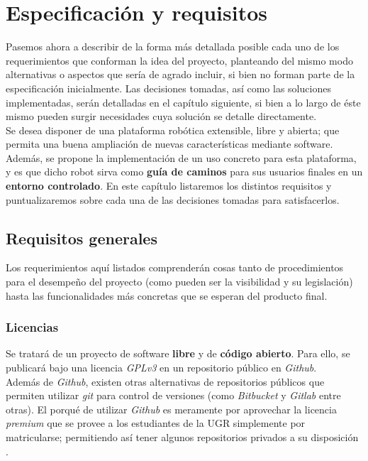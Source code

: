 \chapter{Especificación y requisitos}

Pasemos ahora a describir de la forma más detallada posible cada uno de los requerimientos que conforman la idea del proyecto, planteando del mismo modo alternativas o aspectos que sería de agrado incluir, si bien no forman parte de la especificación inicialmente. Las decisiones tomadas, así como las soluciones implementadas, serán detalladas en el capítulo siguiente, si bien a lo largo de éste mismo pueden surgir necesidades cuya solución se detalle directamente.\\

Se desea disponer de una plataforma robótica extensible, libre y abierta; que permita una buena ampliación de nuevas características mediante software. Además, se propone la implementación de un uso concreto para esta plataforma, y es que dicho robot sirva como \textbf{guía de caminos} para sus usuarios finales en un \textbf{entorno controlado}. En este capítulo listaremos los distintos requisitos y puntualizaremos sobre cada una de las decisiones tomadas para satisfacerlos.\\

\section{Requisitos generales}

Los requerimientos aquí listados comprenderán cosas tanto de procedimientos para el desempeño del proyecto (como pueden ser la visibilidad y su legislación) hasta las funcionalidades más concretas que se esperan del producto final.\\

\subsection{Licencias}

Se tratará de un proyecto de software \textbf{libre} y de \textbf{código abierto}. Para ello, se publicará bajo una licencia \textit{GPLv3} en un repositorio público en \textit{Github}.\\

Además de \textit{Github}, existen otras alternativas de repositorios públicos que permiten utilizar \textit{git} para control de versiones (como \textit{Bitbucket} y \textit{Gitlab} entre otras). El porqué de utilizar \textit{Github} es meramente por aprovechar la licencia \textit{premium} que se provee a los estudiantes de la UGR simplemente por matricularse; permitiendo así tener algunos repositorios privados a su disposición \cite{github-premium}.\\

